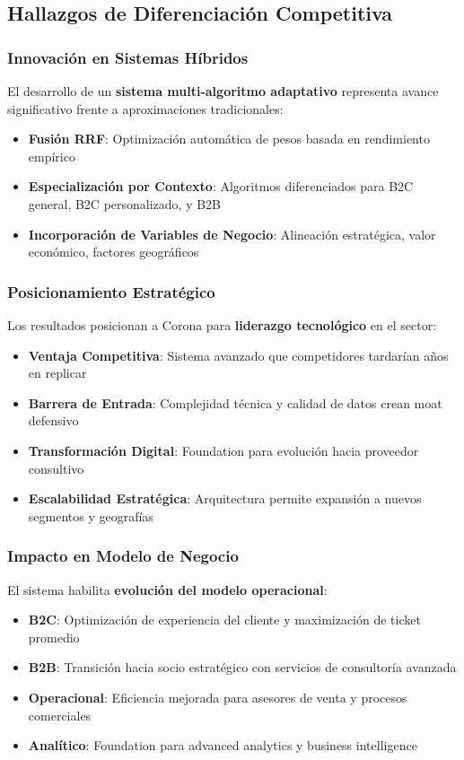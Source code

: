 \documentclass[twocolumn]{article}
\begin{document}
\subsection{Hallazgos de Diferenciación Competitiva}

\subsubsection{Innovación en Sistemas Híbridos}

El desarrollo de un \textbf{sistema multi-algoritmo adaptativo} representa avance significativo frente a aproximaciones tradicionales:
\begin{itemize}
    \item \textbf{Fusión RRF}: Optimización automática de pesos basada en rendimiento empírico
    \item \textbf{Especialización por Contexto}: Algoritmos diferenciados para B2C general, B2C personalizado, y B2B
    \item \textbf{Incorporación de Variables de Negocio}: Alineación estratégica, valor económico, factores geográficos
\end{itemize}

\subsubsection{Posicionamiento Estratégico}

Los resultados posicionan a Corona para \textbf{liderazgo tecnológico} en el sector:
\begin{itemize}
    \item \textbf{Ventaja Competitiva}: Sistema avanzado que competidores tardarían años en replicar
    \item \textbf{Barrera de Entrada}: Complejidad técnica y calidad de datos crean moat defensivo
    \item \textbf{Transformación Digital}: Foundation para evolución hacia proveedor consultivo
    \item \textbf{Escalabilidad Estratégica}: Arquitectura permite expansión a nuevos segmentos y geografías
\end{itemize}

\subsubsection{Impacto en Modelo de Negocio}

El sistema habilita \textbf{evolución del modelo operacional}:
\begin{itemize}
    \item \textbf{B2C}: Optimización de experiencia del cliente y maximización de ticket promedio
    \item \textbf{B2B}: Transición hacia socio estratégico con servicios de consultoría avanzada
    \item \textbf{Operacional}: Eficiencia mejorada para asesores de venta y procesos comerciales
    \item \textbf{Analítico}: Foundation para advanced analytics y business intelligence
\end{itemize}
\end{document}
